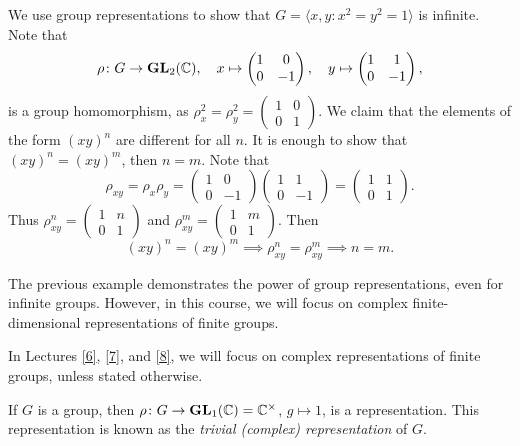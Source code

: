 \begin{example}
	We use group representations to show that 
	$G=\langle x,y:x^2=y^2=1\rangle$ is infinite. Note that
	\[
	\rho\colon G\to\mathbf{GL}_2(\mathbb{C}),
	\quad
	x\mapsto\begin{pmatrix}
		1&0\\
		0&-1	
	\end{pmatrix},\quad
 	y\mapsto\begin{pmatrix}
		1&1\\
		0&-1	
	\end{pmatrix},
 	\]
 	is a group homomorphism, as 
 	$\rho_x^2=\rho_y^2=\begin{pmatrix}
		1&0\\
		0&1	
	\end{pmatrix}$. We claim that the elements of the form $(xy)^n$ are
	different for all $n$. It is enough to show that   
	$(xy)^n=(xy)^m$, then $n=m$. Note that
	\[
	\rho_{xy}=\rho_x\rho_y=\begin{pmatrix}
		1&0\\
		0&-1	
	\end{pmatrix}
	\begin{pmatrix}
		1&1\\
		0&-1	
	\end{pmatrix}
	=\begin{pmatrix}
		1&1\\
		0&1	
	\end{pmatrix}.
	\]
	Thus $\rho_{xy}^n=\begin{pmatrix}
		1&n\\
		0&1	
	\end{pmatrix}$ and 
	$\rho_{xy}^m=\begin{pmatrix}
		1&m\\
		0&1	
	\end{pmatrix}$. Then 
	\[
	(xy)^n=(xy)^m\implies\rho_{xy}^n=\rho_{xy}^m\implies n=m.
	\] 
\end{example}

The previous example demonstrates the power of group representations, even for infinite groups. 
However, in this course, we will focus on complex finite-dimensional representations of finite groups.

\begin{convention}
    In Lectures \ref{6}, \ref{7}, and \ref{8}, we will focus on complex representations of finite groups, unless stated otherwise.
\end{convention}

\begin{example}
	If $G$ is a group, then $\rho\colon G\to\mathbf{GL}_1(\mathbb{C})=\mathbb{C}^\times$, $g\mapsto 1$, 
	is a representation. This representation is known as the \emph{trivial (complex) representation} of $G$. 	
\end{example}

